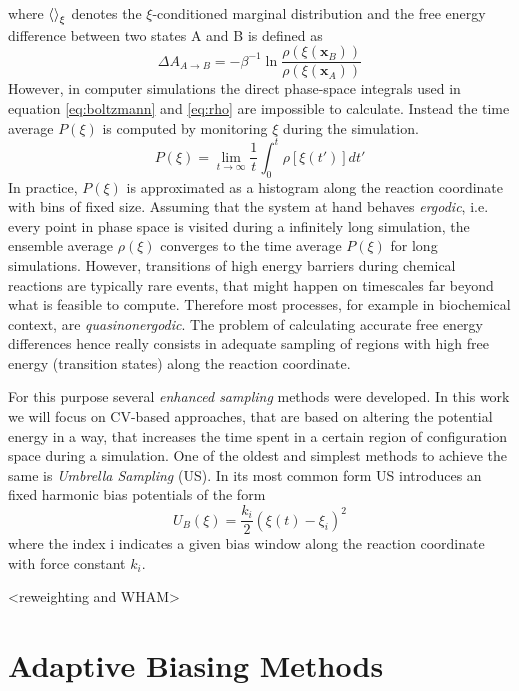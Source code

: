 where $\braket{}_\xi$ denotes the $\xi$-conditioned marginal distribution and the free energy difference between two states A and B is defined as
\begin{equation}
  \Delta A_{A\rightarrow B} = -\beta^{-1}\ln \frac{\rho(\xi(\textbf{x}_B))}{\rho(\xi(\textbf{x}_A))}
  \label{eq:free energy unbiased}
\end{equation}
However, in computer simulations the direct phase-space integrals used in equation  \ref{eq:boltzmann} and \ref{eq:rho} are impossible to calculate. Instead the time average $P(\xi)$ is computed by monitoring $\xi$ during the simulation.
\begin{equation}
  P(\xi)=\lim_{t\rightarrow \infty}\frac{1}{t} \int_0^t \rho[\xi (t')] dt'
  \label{eq:ergodic}
\end{equation}
In practice, $P(\xi)$ is approximated as a histogram along the reaction coordinate with bins of fixed size.
Assuming that the system at hand behaves \textit{ergodic}, i.e. every point in phase space is visited during a infinitely long simulation, the ensemble average $\rho(\xi)$ converges to the time average $P(\xi)$ for long simulations. However, transitions of high energy barriers during chemical reactions are typically rare events, that might happen on timescales far beyond what is feasible to compute. Therefore most processes, for example in biochemical context, are \textit{quasinonergodic}. The problem of calculating accurate free energy differences hence really consists in adequate sampling of regions with high free energy (transition states) along the reaction coordinate.

For this purpose several \textit{enhanced sampling} methods were developed.\autocite{} In this work we will focus on CV-based approaches, that are based on altering the potential energy in a way, that increases the time spent in a certain region of configuration space during a simulation. One of the oldest and simplest methods to achieve the same is \textit{Umbrella Sampling} (US). In its most common form US introduces an fixed harmonic bias potentials of the form
\begin{equation}
  U_{B}(\xi) = \frac{k_i}{2}(\xi(t)-\xi_i)^2
\end{equation}
where the index i indicates a given bias window along the reaction coordinate with force constant $k_i$.

<reweighting and WHAM>

\section{Adaptive Biasing Methods}
\label{sec:adaptive biasing}

